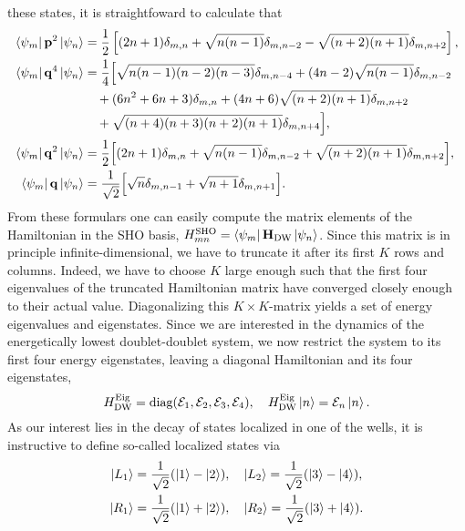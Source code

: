 \documentclass[11pt]{article}
\begin{document}
these states, it is straightfoward to calculate that
%
\begin{equation}
\begin{split}
    \bra{\psi_m}\mathbf{p}^2\ket{\psi_n} &= \frac{1}{2} \left[(2n+1)\delta_{m,n}
    +\sqrt{n(n-1)}\delta_{m,n-2} - \sqrt{(n+2)(n+1)}\delta_{m,n+2} \right],  \\
    \bra{\psi_m}\mathbf{q}^4\ket{\psi_n} &= \frac{1}{4} \Bigl[ \sqrt{n(n-1)(n-2)(n-3)}\delta_{m,n-4} 
    +(4n-2)\sqrt{n(n-1)}\delta_{m,n-2} \\
    &\ \ \ + (6n^2+6n+3)\delta_{m,n} + (4n+6)\sqrt{(n+2)(n+1)}\delta_{m,n+2} \\
    &\ \ \ + \sqrt{(n+4)(n+3)(n+2)(n+1)}\delta_{m,n+4} \Bigr], \\
    \bra{\psi_m}\mathbf{q}^2\ket{\psi_n} &= \frac{1}{2} \Bigl[ (2n+1)\delta_{m,n}
    +\sqrt{n(n-1)}\delta_{m,n-2} +\sqrt{(n+2)(n+1)}\delta_{m,n+2} \Bigr], \\
    \bra{\psi_m}\mathbf{q}\ket{\psi_n} &= \frac{1}{\sqrt{2}} \Bigl[ \sqrt{n}\delta_{m,n-1}
    +\sqrt{n+1}\delta_{m,n+1} \Bigr].
\end{split}
\end{equation}
%
From these formulars one can easily compute the matrix elements of the Hamiltonian in 
the SHO basis, $H^{\text{SHO}}_{mn}=\bra{\psi_m}\mathbf{H}_{\text{DW}}\ket{\psi_n}$. 
Since this matrix is in principle infinite-dimensional, we have to truncate it after its 
first $K$ rows and columns. Indeed, we have to choose $K$ large enough such that the first
four eigenvalues of the truncated Hamiltonian matrix have converged closely enough to 
their actual value. Diagonalizing this $K\times K$-matrix yields a set of energy eigenvalues
and eigenstates.
Since we are interested in the dynamics of the energetically lowest
doublet-doublet system, we now restrict the system to its first four energy eigenstates, 
leaving a diagonal Hamiltonian and its four eigenstates,
%
\begin{equation}
    H_{\text{DW}}^{\text{Eig}} = \text{diag}(\mathcal{E}_1,\mathcal{E}_2,\mathcal{E}_3,\mathcal{E}_4),
    \ \ \ H_{\text{DW}}^{\text{Eig}}\ket{n}=\mathcal{E}_n\ket{n}.
\end{equation}
%
As our interest lies in the decay of states localized in one of the wells, it is instructive
to define so-called localized states via 
%
\begin{equation}
\begin{split}
    \ket{L_1}&=\frac{1}{\sqrt{2}} ( \ket{1}-\ket{2} ), \ \ \ \ket{L_2}=\frac{1}{\sqrt{2}}( \ket{3}-\ket{4} ), \\
    \ket{R_1}&=\frac{1}{\sqrt{2}} ( \ket{1}+\ket{2} ), \ \ \ \ket{R_2}=\frac{1}{\sqrt{2}}( \ket{3}+\ket{4} ).
\end{split}
\end{equation}
\end{document}
